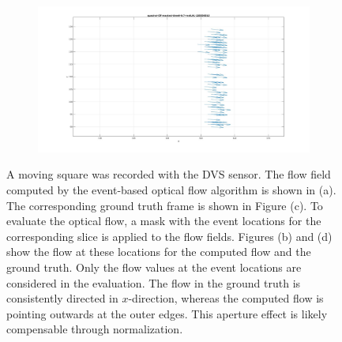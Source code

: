 \begin{figure}[tb]
\begin{subfigure}{.45\textwidth}
  \caption{}
  \label{fig:qaudrat-close-masking-3}
\end{subfigure}
\begin{subfigure}{.45\textwidth}
  \centering
  \includegraphics[height=.6\linewidth]{figs/quadrat_close_GT_masked.jpg}
  \caption{}
  \label{fig:qaudrat-close-masking-4}
\end{subfigure}
\caption[First scene: Square moving to the right.]{A moving square was recorded with the DVS sensor.
The flow field computed by the event-based optical flow algorithm is shown in (a).
The corresponding ground truth frame is shown in Figure (c).
To evaluate the optical flow, a mask with the event locations for the corresponding slice is applied to the flow fields.
Figures (b) and (d) show the flow at these locations for the computed flow and the ground truth.
Only the flow values at the event locations are considered in the evaluation.
The flow in the ground truth is consistently directed in $x$-direction, whereas the computed flow is pointing outwards at the outer edges. This aperture effect is likely compensable through normalization.}
\label{fig:qaudrat-close-masking}
\end{figure}

